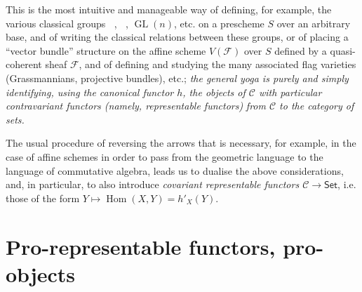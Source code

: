 \documentclass{article}
\theoremstyle{plain}
\theoremstyle{definition}
\newcommand{\sh}[1]{{\mathscr{#1}}}
\newcommand{\cat}[1]{{\mathcal{#1}}}
\newcommand{\Set}{\mathsf{Set}}
\DeclareMathOperator{\Hom}{Hom}
\DeclareMathOperator{\GL}{GL}
\DeclareMathOperator{\Ga}{G_a}
\DeclareMathOperator{\Gm}{G_m}
\newcommand{\oldpage}[1]{\marginpar{\footnotesize$\Big\vert$ \textit{p.~#1}}}
\begin{document}
This is the most intuitive and manageable way of defining, for example, the various classical groups $\Ga$, $\Gm$, $\GL(n)$, etc. on a prescheme $S$ over an arbitrary base, and of writing the classical relations between these groups, or of placing a ``vector bundle'' structure on the affine scheme $V(\sh{F})$ over $S$ defined by a quasi-coherent sheaf $\sh{F}$, and of defining and studying the many associated flag varieties (Grassmannians, projective bundles), etc.;
\emph{the general yoga is purely and simply identifying, using the canonical functor $h$, the objects of $\cat{C}$ with particular contravariant functors (namely, representable functors)}
\oldpage{195-03}
\emph{from $\cat{C}$ to the category of sets.}

The usual procedure of reversing the arrows that is necessary, for example, in the case of affine schemes in order to pass from the geometric language to the language of commutative algebra, leads us to dualise the above considerations, and, in particular, to also introduce \emph{covariant representable functors $\cat{C}\to\Set$}, i.e. those of the form $Y\mapsto\Hom(X,Y)=h'_X(Y)$.


\section{Pro-representable functors, pro-objects}
\label{A.2}
\end{document}
